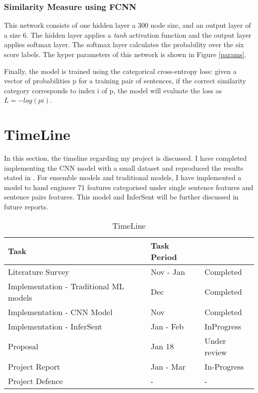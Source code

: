 \documentclass[12pt]{report} %
\begin{document}
	\subsubsection*{Similarity Measure using FCNN}
	
	 This network consists of one hidden layer a 300 node size, and an output layer of a size 6. The hidden layer applies a \textit{tanh} activation function and the output layer applies softmax layer. The softmax layer calculates the probability over the six score labels. The hyper parameters of this network is shown in Figure \ref{params}.
	 
	 Finally, the model is trained using the categorical cross-entropy loss: given a vector of probabilities p for a training pair of sentences, if the correct similarity category corresponds to index i of p, the model will evaluate the loss as $L = − log(pi)$.
	 	
	\section{TimeLine}
	In this section, the timeline regarding my project is discussed. I have completed implementing the CNN model with a small dataset and reproduced the results stated in \cite{shao2017hcti}. For ensemble models and traditional models, I have implemented a model to hand engineer 71 features categorised under single sentence features and sentence pairs features. This model and InferSent will be further discussed in future reports. 
	
	\begin{table}[ht]
		\centering
		\caption{TimeLine}
		\label{my-label}
		\begin{tabular}{|l|l|l|}
			\hline
			Task                          & Task Period &             \\
			\hline
			Literature Survey             & Nov - Jan   & Completed   \\
			\hline
			Implementation - Traditional ML models & Dec         & Completed   \\
			\hline
			Implementation - CNN Model   & Nov         & Completed   \\
			\hline
			Implementation - InferSent   & Jan - Feb   &  InProgress \\
			\hline
			Proposal                      & Jan 18        & Under review          \\
			\hline
			Project Report                & Jan - Mar   & In-Progress           \\
			\hline
			Project Defence               &       -      & - \\    
			\hline       
		\end{tabular}
	\end{table}
   

   
\end{document}
